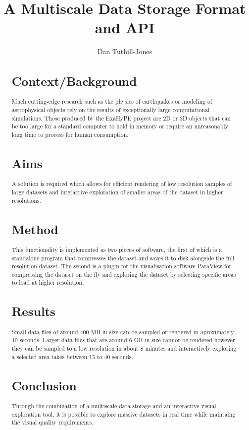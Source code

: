 \documentclass[12pt,a4paper]{article}
\title{A Multiscale Data Storage Format and API}
\author{Dan Tuthill-Jones}
\date{}
\begin{document}
\maketitle

\begin{abstract}
\section*{Context/Background}
Much cutting-edge research such as the physics of earthquakes or modeling of astrophysical objects rely on the results of exceptionally large computational simulations. Those produced by the ExaHyPE project are 2D or 3D objects that can be too large for a standard computer to hold in memory or require an unreasonably long time to process for human consumption.

\section*{Aims}
A solution is required which allows for efficient rendering of low resolution samples of large datasets and interactive exploration of smaller areas of the dataset in higher resolutions.

\section*{Method}
This functionality is implemented as two pieces of software, the first of which is a standalone program that compresses the dataset and saves it to disk alongside the full resolution dataset. The second is a plugin for the visualisation software ParaView for compressing the dataset on the fly and exploring the dataset by selecting specific areas to load at higher resolution.

\section*{Results}
Small data files of around 400 MB in size can be sampled or rendered in aproximately 40 seconds. Larger data files that are around 6 GB in size cannot be rendered however they can be sampled to a low resolution in about 8 minutes and interactively exploring a selected area takes between 15 to 40 seconds.

\section*{Conclusion}
Through the combination of a multiscale data storage and an interactive visual exploration tool, it is possible to explore massive datasets in real time while maintaing the visual quality requirements.
\end{abstract}
\end{document}
